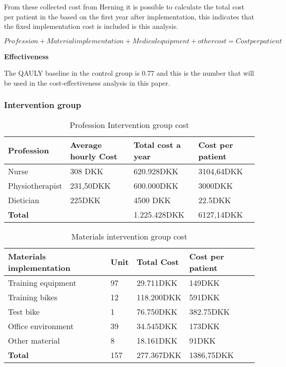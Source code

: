From these collected cost from Herning it is possible to calculate the total cost per patient in the based on the first year after implementation, this indicates that the fixed implementation cost is included is this analysis.

$$Profession + Material implementation + Medical equipment + other cost = Cost per patient$$

\textbf{Effectiveness}

 The QAULY baseline in the control group is 0.77 and this is the number that will be used in the cost-effectiveness analysis in this paper\cite{costeffect}. 

\subsubsection{Intervention group}

\begin{table}[H]
\begin{longtabu} to 
    \textbf{Profession} & \textbf{Average hourly Cost} & \textbf{Total cost a year} & \textbf{Cost per patient} \\[-1ex]
    \midrule
     Nurse   &    308 DKK & 620.928DKK & 3104,64DKK \\ \hline
    Physiotherapist   &   231,50DKK  & 600.000DKK & 3000DKK \\ \hline
    Dietician   &  225DKK &    4500 DKK    & 22.5DKK \\ 
    \hline \hline \hline
    \textbf{Total} & & 1.225.428DKK & 6127,14DKK
    \newline
   \end{longtabu}
\caption{Profession Intervention group cost}
\label{tab: PI}
\end{table}

\begin{table}[H]
\begin{longtabu} to 
    \textbf{Materials implementation} & \textbf{Unit} &\textbf{Total Cost} & \textbf{Cost per patient} \\[-1ex]
    \midrule
    Training equipment   &  97 &  29.711DKK & 149DKK \\ \hline
    Training bikes   & 12 & 118.200DKK & 591DKK  \\ \hline
    Test bike    &  1 & 76.750DKK &   382.75DKK \\ \hline 
    Office environment    &  39 & 34.545DKK  &   173DKK  \\ \hline 
    Other material   &  8 & 18.161DKK  &   91DKK\\
    \hline \hline \hline
    \textbf{Total} & 157 & 277.367DKK & 1386,75DKK
    \newline
   \end{longtabu}
\caption{Materials intervention group cost}
\label{tab: MI}
\end{table}

